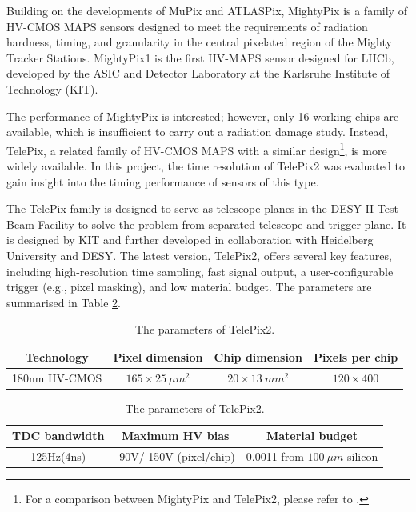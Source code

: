 Building on the developments of MuPix\cite{Mupix}\cite{Mupix2} and ATLASPix\cite{ATLASPix}\cite{MupixATLASPix}, MightyPix is a family of HV-CMOS MAPS sensors designed to meet the requirements of radiation hardness, timing, and granularity in the central pixelated region of the Mighty Tracker Stations. MightyPix1 is the first HV-MAPS sensor designed for LHCb\cite{MightypixUpdate}, developed by the ASIC and Detector Laboratory at the Karlsruhe Institute of Technology (KIT)\cite{KIT}. 

The performance of MightyPix is interested; however, only 16 working chips are available, which is insufficient to carry out a radiation damage study. Instead, TelePix, a related family of HV-CMOS MAPS with a similar design\footnote{For a comparison between MightyPix and TelePix2, please refer to \cite{Mightypix}\cite{TP2manual}.}, is more widely available. In this project, the time resolution of TelePix2 was evaluated to gain insight into the timing performance of sensors of this type.

The TelePix family is designed to serve as telescope planes in the DESY II Test Beam Facility to solve the problem from separated telescope and trigger plane\cite{Telepix}. It is designed by KIT and further developed in collaboration with Heidelberg University and DESY\cite{DESYreport}. The latest version, TelePix2, offers several key features, including high-resolution time sampling, fast signal output, a user-configurable trigger (e.g., pixel masking), and low material budget. The parameters are summarised in Table \ref{Table:TP2}.



\begin{table}[h!]
\centering
\begin{tabular}{||c | c | c | c||} 
\hline
 Technology & Pixel dimension & Chip dimension & Pixels per chip \\
 \hline
180nm HV-CMOS & $165 \times 25 \: \mu m^{2}$ & $20 \times 13 \: mm^{2}$ & $ 120 \times 400$\\ [1ex]
\hline
\end{tabular}

\vspace{0.6em}

\begin{tabular}{||c | c | c||}
\hline
TDC bandwidth & Maximum HV bias & Material budget\\
\hline
125Hz(4ns) & -90V/-150V (pixel/chip) &  0.0011 from $100 \: \mu m$ silicon \\[1ex]
\hline
\end{tabular}
\caption{The parameters of TelePix2\cite{Telepix}\cite{teststart}.}
\label{Table:TP2}
\end{table}
